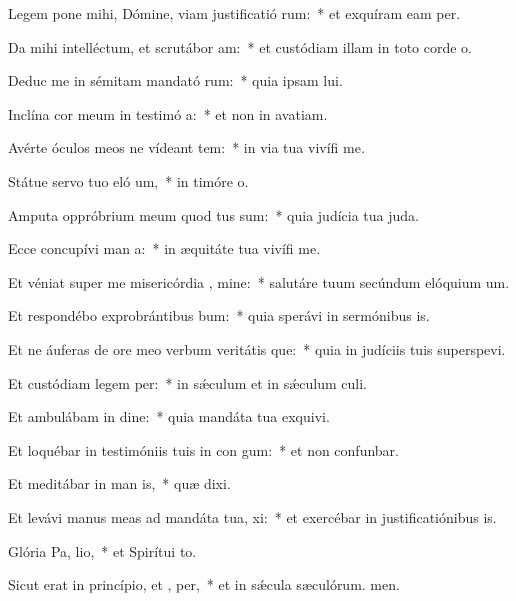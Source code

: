 \item Legem pone mihi, Dómine, viam justificatió rum:~* et exquíram eam per.
\item Da mihi intelléctum, et scrutábor  am:~* et custódiam illam in toto corde o.
\item Deduc me in sémitam mandató rum:~* quia ipsam lui.
\item Inclína cor meum in testimó a:~* et non in avatiam.
\item Avérte óculos meos ne vídeant tem:~* in via tua vivífi me.
\item Státue servo tuo eló um,~* in timóre o.
\item Amputa oppróbrium meum quod tus sum:~* quia judícia tua juda.
\item Ecce concupívi man a:~* in æquitáte tua vivífi me.
\item Et véniat super me misericórdia , mine:~* salutáre tuum secúndum elóquium um.
\item Et respondébo exprobrántibus  bum:~* quia sperávi in sermónibus is.
\item Et ne áuferas de ore meo verbum veritátis que:~* quia in judíciis tuis superspevi.
\item Et custódiam legem  per:~* in sǽculum et in sǽculum culi.
\item Et ambulábam in dine:~* quia mandáta tua exquivi.
\item Et loquébar in testimóniis tuis in con gum:~* et non confunbar.
\item Et meditábar in man is,~* quæ dixi.
\item Et levávi manus meas ad mandáta tua,  xi:~* et exercébar in justificatiónibus is.
\item Glória Pa,  lio,~* et Spirítui to.
\item Sicut erat in princípio, et ,  per,~* et in sǽcula sæculórum. men.

